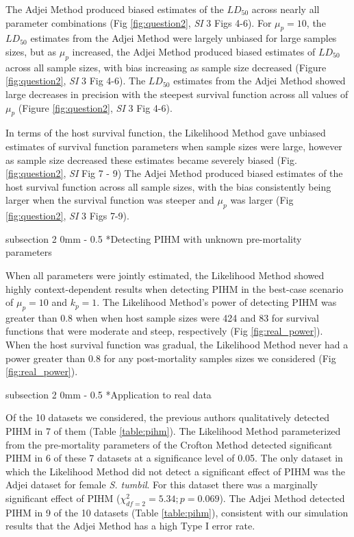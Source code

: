 \documentclass[12pt, a4paper]{article}
\makeatletter
\renewcommand{\subsection}{\@startsection
{subsection}%
{2}%
{0mm}%
{-\baselineskip}%
{0.5\baselineskip}%
{\normalfont\bf}} %
\makeatother
\begin{document}
The Adjei Method produced biased estimates of the $LD_{50}$ across nearly all parameter combinations (Fig \ref{fig:question2}, \emph{SI} 3 Figs 4-6).  For $\mu_p = 10$, the $LD_{50}$
estimates from the Adjei Method were largely unbiased for large samples sizes, but as $\mu_p$ increased, the Adjei Method
produced biased estimates of $LD_{50}$ across all sample sizes, with bias
increasing as sample size decreased (Figure \ref{fig:question2}, \emph{SI} 3 Fig 4-6). The $LD_{50}$ estimates from the Adjei
Method showed large decreases in precision with the steepest survival function across all values of $\mu_p$ (Figure \ref{fig:question2}, \emph{SI} 3 Fig 4-6).

In terms of the host survival function, the Likelihood Method gave unbiased estimates of survival function parameters when sample sizes were large, however as sample size decreased these estimates became severely biased (Fig. \ref{fig:question2}, \emph{SI} Fig 7 - 9) The Adjei Method produced
biased estimates of the host survival function across all sample sizes, with the bias
consistently being larger when the survival function was steeper and $\mu_p$ was larger (Fig \ref{fig:question2}, \emph{SI} 3 Figs 7-9).

\subsection*{Detecting PIHM with unknown pre-mortality parameters}

When all parameters were jointly estimated, the Likelihood Method showed highly
context-dependent results when detecting PIHM in the best-case scenario of
$\mu_p = 10$ and $k_p = 1$. The Likelihood Method's power of detecting PIHM was
greater than 0.8 when when host sample sizes were 424 and 83  for survival
functions that were moderate and steep, respectively (Fig
\ref{fig:real_power}).  When the host survival function was gradual, the
Likelihood Method never had a power greater than 0.8 for any post-mortality
samples sizes we considered (Fig \ref{fig:real_power}).

\subsection*{Application to real data}

Of the 10 datasets we considered, the previous authors qualitatively detected PIHM
in 7 of them (Table \ref{table:pihm}).  The Likelihood Method parameterized
from the pre-mortality parameters of the Crofton Method detected significant
PIHM in 6 of these 7 datasets at a significance level of 0.05.  The only
dataset in which the Likelihood Method did not detect a significant effect of PIHM was the Adjei dataset
for female \emph{S. tumbil}.  For this dataset there was a marginally significant effect
of PIHM ($\chi^2_{df=2} = 5.34; p = 0.069$). The Adjei Method detected PIHM in 9 of the 10 datasets (Table \ref{table:pihm}), consistent with our simulation results that the Adjei Method has a high Type I error rate.
\end{document}
